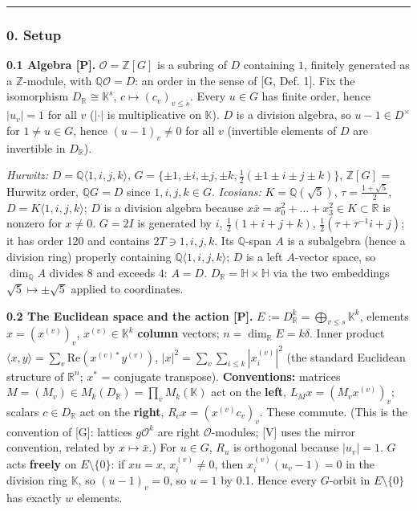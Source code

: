 \begin{center}\rule{0.5\linewidth}{0.5pt}\end{center}

\hypertarget{setup}{%
\subsubsection*{0. Setup}\label{setup}}

\textbf{0.1 Algebra {[}P{]}.} \(\mathcal O=\mathbb Z[G]\) is a subring of \(D\) containing \(1\), finitely generated as a \(\mathbb Z\)-module, with \(\mathbb Q\mathcal O=D\):
an order in the sense of {[}G, Def. 1{]}. Fix the isomorphism \(D_{\mathbb R}\cong\mathbb K^s\), \(c\mapsto(c_v)_{v\le s}\). Every \(u\in G\) has finite order, hence
\(|u_v|=1\) for all \(v\) (\(|\cdot|\) is multiplicative on \(\mathbb K\)). \(D\) is a division algebra, so \(u-1\in D^\times\) for \(1\ne u\in G\), hence \((u-1)_v\neq0\) for all \(v\)
(invertible elements of \(D\) are invertible in \(D_\mathbb R\)).

\emph{Hurwitz:} \(D=\mathbb Q\langle1,i,j,k\rangle\), \(G=\{\pm1,\pm i,\pm j,\pm k,\tfrac12(\pm1\pm i\pm j\pm k)\}\), \(\mathbb Z[G]\) = Hurwitz order, \(\mathbb Q G=D\) since \(1,i,j,k\in G\).
\emph{Icosians:} \(K=\mathbb Q(\sqrt5)\), \(\tau=\frac{1+\sqrt5}2\), \(D=K\langle1,i,j,k\rangle\); \(D\) is a division algebra because \(x\bar x=x_0^2+\dots+x_3^2\in K\subset\mathbb R\)
is nonzero for \(x\ne0\). \(G=2I\) is generated by \(i\), \(\tfrac12(1+i+j+k)\), \(\tfrac12(\tau+\tau^{-1}i+j)\); it has order 120 and contains \(2T\ni 1,i,j,k\).
Its \(\mathbb Q\)-span \(A\) is a subalgebra (hence a division ring) properly containing \(\mathbb Q\langle1,i,j,k\rangle\); \(D\) is a left \(A\)-vector space, so
\(\dim_{\mathbb Q}A\) divides \(8\) and exceeds \(4\): \(A=D\). \(D_{\mathbb R}=\mathbb H\times\mathbb H\) via the two embeddings \(\sqrt5\mapsto\pm\sqrt5\) applied to coordinates.

\textbf{0.2 The Euclidean space and the action {[}P{]}.} \(E:=D_{\mathbb R}^k=\bigoplus_{v\le s}\mathbb K^k\), elements \(x=(x^{(v)})_v\), \(x^{(v)}\in\mathbb K^k\) \textbf{column} vectors;
\(n=\dim_{\mathbb R}E=k\delta\). Inner product \(\langle x,y\rangle=\sum_v\mathrm{Re}(x^{(v)*}y^{(v)})\), \(|x|^2=\sum_v\sum_{i\le k}|x^{(v)}_i|^2\) (the standard
Euclidean structure of \(\mathbb R^n\); \(x^*\) = conjugate transpose). \textbf{Conventions:} matrices \(M=(M_v)\in M_k(D_{\mathbb R})=\prod_vM_k(\mathbb K)\) act on the \textbf{left},
\(L_M x=(M_vx^{(v)})_v\); scalars \(c\in D_{\mathbb R}\) act on the \textbf{right}, \(R_cx=(x^{(v)}c_v)_v\). These commute. (This is the convention of {[}G{]}: lattices \(g\mathcal O^k\) are
right \(\mathcal O\)-modules; {[}V{]} uses the mirror convention, related by \(x\mapsto\bar x\).) For \(u\in G\), \(R_u\) is orthogonal because \(|u_v|=1\).
\(G\) acts \textbf{freely} on \(E\setminus\{0\}\): if \(xu=x\), \(x^{(v)}_i\ne0\), then \(x^{(v)}_i(u_v-1)=0\) in the division ring \(\mathbb K\), so \((u-1)_v=0\), so \(u=1\) by 0.1.
Hence every \(G\)-orbit in \(E\setminus\{0\}\) has exactly \(w\) elements.

